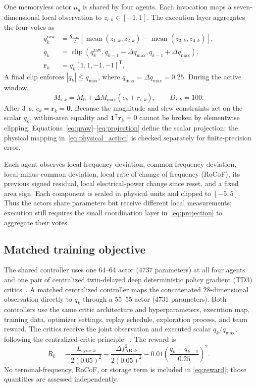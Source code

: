 \documentclass[conference,a4paper]{IEEEtran}
\begin{document}
One memoryless actor \(\mu_\theta\) is shared by four agents. Each invocation
maps a seven-dimensional local observation to
\(z_{i,k}\in[-1,1]\). The execution layer aggregates the four votes as
\begin{align}
 q^{\mathrm{raw}}_k
 &=\frac{q_{\max}}{2}
 \left[\operatorname{mean}(z_{1,k},z_{2,k})
 -\operatorname{mean}(z_{3,k},z_{4,k})\right],\label{eq:qraw}\\
 q_k&=\operatorname{clip}\!\left(q^{\mathrm{raw}}_k,
 q_{k-1}-\Delta q_{\max},q_{k-1}+\Delta q_{\max}\right),
 \label{eq:qclip}\\
 \mathbf r_k&=q_k[1,1,-1,-1]^\mathsf T ,
\label{eq:projection}
\end{align}
A final clip enforces \(|q_k|\le q_{\max}\), where
\(q_{\max}=\Delta q_{\max}=0.25\). During the active window,
\begin{equation}
 M_{i,k}=M_0+\Delta M_{\max}(c_k+r_{i,k}),\qquad D_{i,k}=100 .
\label{eq:physical_action}
\end{equation}
After \SI{3}{s}, \(c_k=\mathbf r_k=\mathbf0\). Because the magnitude and slew
constraints act on the scalar \(q_k\), within-area equality and
\(\mathbf1^\mathsf T\mathbf r_k=0\) cannot be broken by elementwise clipping.
Equations~\eqref{eq:qraw}--\eqref{eq:projection} define the scalar projection;
the physical mapping in~\eqref{eq:physical_action} is checked separately for
finite-precision error.

Each agent observes local frequency deviation, common frequency deviation,
local-minus-common deviation, local rate of change of frequency (RoCoF), its
previous signed residual, local electrical-power change since reset, and a
fixed area sign. Each component is scaled in physical units and clipped to
\([-5,5]\). Thus the actors share
parameters but receive different local measurements; execution still requires
the small coordination layer in~\eqref{eq:projection} to aggregate their
votes.\subsection{Matched training objective}

The shared controller uses one 64--64 actor (\(4737\) parameters) at all four
agents and one pair of centralized twin-delayed deep deterministic
policy gradient (TD3) critics~\cite{fujimoto2018td3}. A
matched centralized controller maps the concatenated 28-dimensional
observation directly to \(q_k\) through a 55--55 actor (\(4731\) parameters).
Both controllers use the same critic architecture and hyperparameters,
execution map, training data, optimizer settings, replay schedule, exploration
process, and team reward. The critics receive the joint observation and
executed scalar \(q_k/q_{\max}\), following the centralized-critic principle
~\cite{lowe2017maddpg}. The reward is
\begin{equation}
 R_k=-\frac{L_{\mathrm{sync},k}}{2(0.05)^2}
 -\frac{\Delta f_{\mathrm{AB},k}^2}{2(0.05)^2}
 -0.01\left(\frac{q_k-q_{k-1}}{0.25}\right)^2 .
\label{eq:reward}
\end{equation}
No terminal-frequency, RoCoF, or storage term is included in
\eqref{eq:reward}; those quantities are assessed independently.
\end{document}
